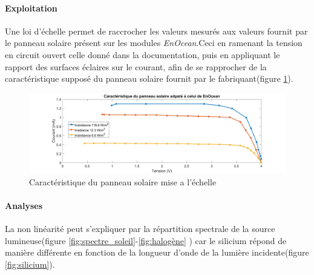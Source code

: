 \documentclass{rapportENS}
\begin{document}
 
 \paragraph{Exploitation} Une loi d'échelle permet de raccrocher les valeurs mesurés aux valeurs fournit par le panneau solaire présent sur les modules \textit{EnOcean}.Ceci en ramenant la tension en circuit ouvert celle donné dans la documentation, puis en appliquant le rapport des surfaces éclaires sur  le courant, afin de se rapprocher de la caractéristique supposé du panneau solaire fournit par le fabriquant(figure \ref{fig:plot_enocean}).
 
 \begin{figure}[h!]
     \centering
     \includegraphics[width=\linewidth]{plot_enocean.png}
     \caption{Caractéristique du panneau solaire mise a l'échelle}
     \label{fig:plot_enocean}
 \end{figure}
 
 
 
 
 \paragraph{Analyses}La non linéarité  peut s'expliquer par la répartition spectrale de la source lumineuse(figure  \ref{fig:spectre_soleil}-\ref{fig:halogène} ) car le silicium répond de manière différente en fonction de la longueur d'onde de la lumière incidente(figure \ref{fig:silicium}).
 
\end{document}
